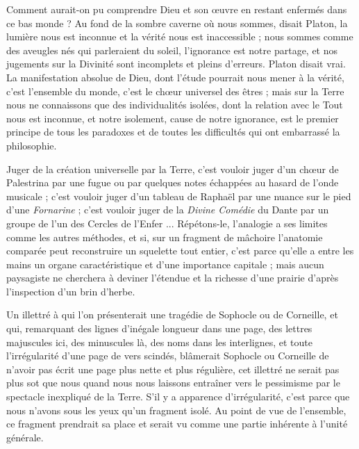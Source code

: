 \documentclass[a4paper, 11pt, oneside, landscape]{article}
\begin{document}
Comment aurait-on pu comprendre Dieu et son œuvre en restant enfermés dans ce bas monde ? Au fond de la sombre caverne où nous sommes, disait Platon, la lumière nous est inconnue et la vérité nous est inaccessible ; nous sommes comme des aveugles nés qui parleraient du soleil, l'ignorance est notre partage, et nos jugements sur la Divinité sont incomplets et pleins d'erreurs. Platon disait vrai. La manifestation absolue de Dieu, dont l'étude pourrait nous mener à la vérité, c'est l'ensemble du monde, c'est le chœur universel des êtres ; mais sur la Terre nous ne connaissons que des individualités isolées, dont la relation avec le Tout nous est inconnue, et notre isolement, cause de notre ignorance, est le premier principe de tous les paradoxes et de toutes les difficultés qui ont embarrassé la philosophie.

Juger de la création universelle par la Terre, c'est vouloir juger d'un chœur de Palestrina par une fugue ou par quelques notes échappées au hasard de l'onde musicale ; c'est vouloir juger d'un tableau de Raphaël par une nuance sur le pied d'une \emph{Fornarine} ; c'est vouloir juger de la \emph{Divine Comédie} du Dante par un groupe de l'un des Cercles de l'Enfer ... Répétons-le, l'analogie a ses limites comme les autres méthodes, et si, sur un fragment de mâchoire l'anatomie comparée peut reconstruire un squelette tout entier, c'est parce qu'elle a entre les mains un organe caractéristique et d'une importance capitale ; mais aucun paysagiste ne cherchera à deviner l'étendue et la richesse d'une prairie d'après l'inspection d'un brin d'herbe.

Un illettré à qui l'on présenterait une tragédie de Sophocle ou de Corneille, et qui, remarquant des lignes d'inégale longueur dans une page, des lettres majuscules ici, des minuscules là, des noms dans les interlignes, et toute l'irrégularité d'une page de vers scindés, blâmerait Sophocle ou Corneille de n'avoir pas écrit une page plus nette et plus régulière, cet illettré ne serait pas plus sot que nous quand nous nous laissons entraîner vers le pessimisme par le spectacle inexpliqué de la Terre. S'il y a apparence d'irrégularité, c'est parce que nous n'avons sous les yeux qu'un fragment isolé. Au point de vue de l'ensemble, ce fragment prendrait sa place et serait vu comme une partie inhérente à l'unité générale.
\end{document}
